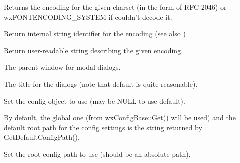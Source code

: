 \label{wxfontmappercharsettoencoding}


Returns the encoding for the given charset (in the form of RFC 2046) or
wxFONTENCODING\_SYSTEM if couldn't decode it.


\label{wxfontmappergetencodingname}


Return internal string identifier for the encoding (see also
)


\label{wxfontmappergetencodingdescription}


Return user-readable string describing the given encoding.


\label{wxfontmappersetdialogparent}


The parent window for modal dialogs.


\label{wxfontmappersetdialogtitle}


The title for the dialogs (note that default is quite reasonable).


\label{wxfontmappersetconfig}


Set the config object to use (may be NULL to use default).

By default, the global one (from wxConfigBase::Get() will be used) 
and the default root path for the config settings is the string returned by
GetDefaultConfigPath().

\label{wxfontmappersetconfigpath}


Set the root config path to use (should be an absolute path).

